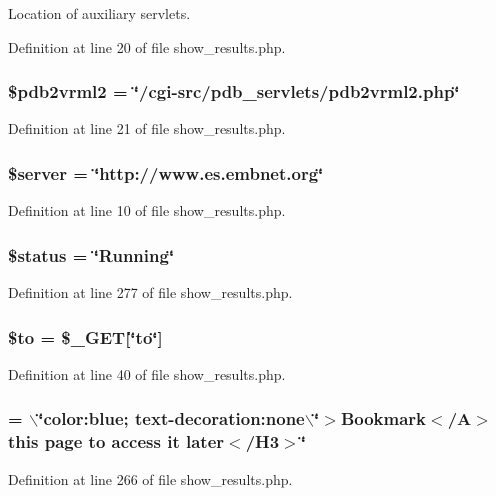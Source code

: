 Location of auxiliary servlets. 



Definition at line 20 of file show\_\-results.php.
\subsubsection{\setlength{\rightskip}{0pt plus 5cm}\$pdb2vrml2 = \char`\"{}/cgi-src/pdb\_\-servlets/pdb2vrml2.php\char`\"{}}\label{show__results_8php_a3}




Definition at line 21 of file show\_\-results.php.
\subsubsection{\setlength{\rightskip}{0pt plus 5cm}\$server = \char`\"{}http://www.es.embnet.org\char`\"{}}\label{show__results_8php_a0}




Definition at line 10 of file show\_\-results.php.
\subsubsection{\setlength{\rightskip}{0pt plus 5cm}\$status = \char`\"{}Running\char`\"{}}\label{show__results_8php_a16}




Definition at line 277 of file show\_\-results.php.
\subsubsection{\setlength{\rightskip}{0pt plus 5cm}\$to = \$\_\-GET[\char`\"{}to\char`\"{}]}\label{show__results_8php_a12}




Definition at line 40 of file show\_\-results.php.
\subsubsection{ = $\backslash$\char`\"{}color:blue; text-decoration:none$\backslash$\char`\"{}$>$Bookmark$<$/A$>$ this page to access it later$<$/H3$>$\char`\"{}}\label{show__results_8php_a15}




Definition at line 266 of file show\_\-results.php.